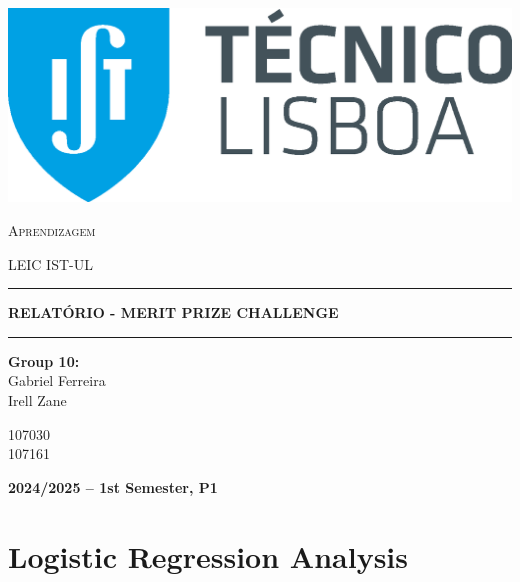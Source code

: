 \documentclass[11pt]{article}
\newcommand{\HRule}[1]{\rule{\linewidth}{#1}}
\begin{document}
\begin{titlepage}
\begin{center}
  \vspace*{1cm}
  \includegraphics[scale = 0.3]{img/IST_A.eps}
  
  \vspace{1.5cm}
  {\LARGE\textsc{Aprendizagem}}
  
  \vspace{0.7cm}
  {\LARGE\textsc{LEIC IST-UL}}
  
  \vspace{0.7cm}
  \HRule{1.5pt}
  \vspace{0.3cm}
  {\LARGE\textbf{\uppercase{Relatório - Merit Prize Challenge}}}
  \HRule{1.5pt}
  
  \vspace{2cm}
  
  \begin{minipage}{0.7\textwidth}
    \begin{flushleft}
      \large\textbf{Group 10:}\\[0.3cm]
      \large Gabriel Ferreira\\
      \large Irell Zane
    \end{flushleft}
  \end{minipage}%
  \begin{minipage}{0.3\textwidth}
    \begin{flushright}
      \large 107030\\
      \large 107161
    \end{flushright}
  \end{minipage}
  
  \vfill
  
  {\large\textbf{2024/2025 -- 1st Semester, P1}}
\end{center}
\end{titlepage}

\section{Logistic Regression Analysis}
\end{document}
